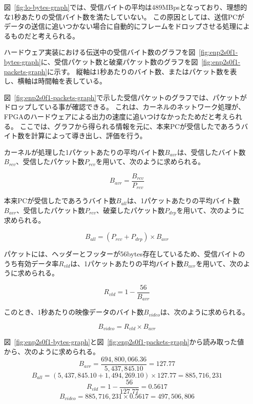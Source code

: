 図~\ref{fig:lo-bytes-graph}では、受信バイトの平均は489MBpsとなっており、理想的な1秒あたりの受信バイト数を満たしていない。
この原因としては、送信PCがデータの送信に追いつかない場合に自動的にフレームをドロップさせる処理によるものだと考えられる。

ハードウェア実装における伝送中の受信バイト数のグラフを図~\ref{fig:enp2s0f1-bytes-graph}に、受信パケット数と破棄パケット数のグラフを図~\ref{fig:enp2s0f1-packets-graph}に示す。
縦軸は1秒あたりのバイト数、またはパケット数を表し、横軸は時間軸を表している。

図~\ref{fig:enp2s0f1-packets-graph}で示した受信パケットのグラフでは、パケットがドロップしている事が確認できる。
これは、カーネルのネットワーク処理が、FPGAのハードウェアによる出力の速度に追いつけなかったためだと考えられる。
ここでは、グラフから得られる情報を元に、本来PCが受信したであろうバイト数を計算によって導き出し、評価を行う。


カーネルが処理した1パケットあたりの平均バイト数$B_{avr}$は、受信したバイト数$B_{rcv}$、受信したパケット数$P_{rcv}$を用いて、次のように求められる。

\[ B_{avr} = \frac{B_{rcv}}{P_{rcv}} \]

本来PCが受信したであろうバイト数$B_{all}$は、1パケットあたりの平均バイト数$B_{avr}$、受信したパケット数$P_{rcv}$、破棄したパケット数$P_{drp}$を用いて、次のように求められる。

\[ B_{all} = (P_{rcv} + P_{drp}) \times B_{avr} \]

パケットには、ヘッダーとフッターが56bytes存在しているため、受信バイトのうち有効データ率$R_{vld}$は、1パケットあたりの平均バイト数$B_{avr}$を用いて、次のように求められる。

\[ R_{vld} = 1 - \frac{56}{B_{avr}} \]

このとき、1秒あたりの映像データのバイト数$B_{video}$は、次のように求められる。

\[ B_{video} = R_{vld} \times B_{avr} \]

図~\ref{fig:enp2s0f1-bytes-graph}と図~\ref{fig:enp2s0f1-packets-graph}から読み取った値から、次のように求められる。
\[ B_{avr} = \frac{694,800,066.36}{5,437,845.10} = 127.77 \]
\[ B_{all} = (5,437,845.10 + 1,494,269.10) \times 127.77 = 885,716,231 \]
\[ R_{vld} = 1 - \frac{56}{127.77} = 0.5617 \]
\[ B_{video} = 885,716,231 \times 0.5617 = 497,506,806 \]

